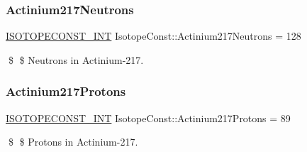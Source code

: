 \subsubsection{\texorpdfstring{Actinium217\+Neutrons}{Actinium217Neutrons}}
{\footnotesize\ttfamily \mbox{\hyperlink{group___isotope_const-_macros_ga5f18360b3e99483a35c32d789e62621c}{I\+S\+O\+T\+O\+P\+E\+C\+O\+N\+S\+T\+\_\+\+I\+NT}} Isotope\+Const\+::\+Actinium217\+Neutrons = 128}

\$ \$ Neutrons in Actinium-\/217. \mbox{\label{group___isotope_const-_actinium-_ac217_gac6430f0ad22d12a58905352e18368d75}} 
\subsubsection{\texorpdfstring{Actinium217\+Protons}{Actinium217Protons}}
{\footnotesize\ttfamily \mbox{\hyperlink{group___isotope_const-_macros_ga5f18360b3e99483a35c32d789e62621c}{I\+S\+O\+T\+O\+P\+E\+C\+O\+N\+S\+T\+\_\+\+I\+NT}} Isotope\+Const\+::\+Actinium217\+Protons = 89}

\$ \$ Protons in Actinium-\/217. 